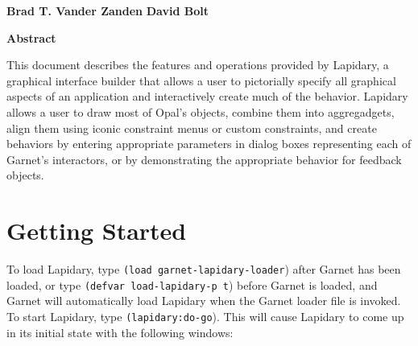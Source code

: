 
\begin{titlepage}
\begin{titlebox}
\vspace{0.6 inch}

{\bf Brad T. Vander Zanden}
{\bf David Bolt}
\vspace{0.3 line}
\value{date}
\end{titlebox}
\vspace{0.5 inch}
\begin{center}
{\bf Abstract}\end{center}
\begin{text}
This document describes the features and operations provided by Lapidary,
a graphical interface builder that allows a user to pictorially specify
all graphical aspects of an application and interactively create much
of the behavior. Lapidary allows a user to draw most of Opal's objects,
combine them into aggregadgets, align them using iconic constraint
menus or custom constraints, and create behaviors by entering appropriate
parameters in dialog boxes representing each of Garnet's interactors, or
by demonstrating the appropriate behavior for feedback objects.

\vspace{0.3 inch}

\end{text}
\end{titlepage}




\chapter{Getting Started}

To load Lapidary, type {\tt (load garnet-lapidary-loader}) after Garnet has
been loaded, or type {\tt (defvar load-lapidary-p t}) before Garnet
is loaded, and Garnet will automatically load Lapidary when the Garnet loader
file is invoked.  To start Lapidary, type {\tt (lapidary:do-go}).
This will cause Lapidary to come up in its initial state
with the following windows:

